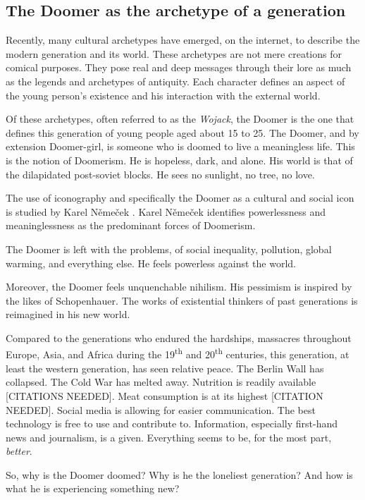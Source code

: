 \documentclass[../report.tex]{subfiles}
\begin{document}
\subsection{The Doomer as the archetype of a generation}

Recently, many cultural archetypes have emerged, on the internet, to describe the modern generation and its world. 
These archetypes are not mere creations for comical purposes. They pose real and deep messages through their lore as much as the legends and archetypes of antiquity.
Each character defines an aspect of the young person's existence and his interaction with the external world. 

Of these archetypes, often referred to as the \textit{Wojack}, the Doomer is the one that defines this generation of young people aged about 15 to 25.
The Doomer, and by extension Doomer-girl, is someone who is doomed to live a meaningless life. This is the notion of Doomerism.
He is hopeless, dark, and alone. His world is that of the dilapidated post-soviet blocks. He sees no sunlight, no tree, no love. 

The use of iconography and specifically the Doomer as a cultural and social icon is studied by Karel Němeček \cite{memes_reservoir}. Karel Němeček identifies powerlessness and meaninglessness as the predominant forces of Doomerism. 

The Doomer is left with the problems, of social inequality, pollution, global warming, and everything else. He feels powerless against the world.

Moreover, the Doomer feels unquenchable nihilism. His pessimism is inspired by the likes of Schopenhauer. The works of existential thinkers of past generations is reimagined in his new world. 

Compared to the generations who endured the hardships, massacres throughout Europe, Asia, and Africa during the 19\textsuperscript{th} and 20\textsuperscript{th} centuries, 
this generation, at least the western generation, has seen relative peace. 
The Berlin Wall has collapsed.
The Cold War has melted away.
Nutrition is readily available [CITATIONS NEEDED]. 
Meat consumption is at its highest [CITATION NEEDED].
Social media is allowing for easier communication.
The best technology is free to use and contribute to.
Information, especially first-hand news and journalism, is a given.
Everything seems to be, for the most part, \textit{better}.

So, why is the Doomer doomed? Why is he the loneliest generation? And how is what he is experiencing something new?
\end{document}
